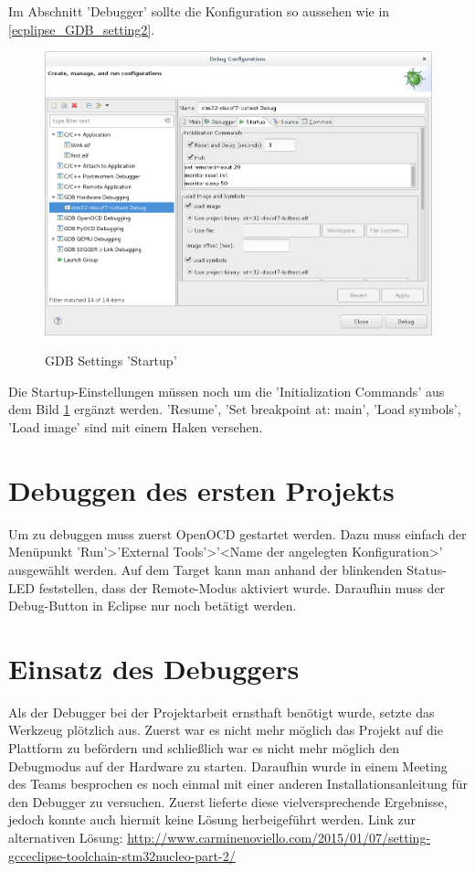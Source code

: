 Im Abschnitt 'Debugger' sollte die Konfiguration so aussehen wie in \ref{ecplipse_GDB_setting2}.
\begin{figure}[h]
\begin{center}
\includegraphics[width=12cm]{grafiken/debugger/GDBsetting3.png}
\label{ecplipse_GDB_setting3}
\caption{GDB Settings 'Startup'}
\end{center}
\end{figure}
Die Startup-Einstellungen müssen noch um die 'Initialization Commands' aus dem Bild \ref{ecplipse_GDB_setting3} ergänzt werden.
'Resume', 'Set breakpoint at: main', 'Load symbols', 'Load image' sind mit einem Haken versehen. 
\FloatBarrier
\section{Debuggen des ersten Projekts}
Um zu debuggen muss zuerst OpenOCD gestartet werden. Dazu muss einfach der Menüpunkt 'Run'>'External Tools'>'<Name der angelegten Konfiguration>' ausgewählt werden. Auf dem Target kann man anhand der blinkenden Status-LED feststellen, dass der Remote-Modus aktiviert wurde. Daraufhin muss der Debug-Button in Eclipse nur noch betätigt werden.
\section{Einsatz des Debuggers}
Als der Debugger bei der Projektarbeit ernsthaft benötigt wurde, setzte das Werkzeug plötzlich aus. Zuerst war es nicht mehr möglich das Projekt auf die Plattform zu befördern und schließlich war es nicht mehr möglich den Debugmodus auf der Hardware zu starten. 
Daraufhin wurde in einem Meeting des Teams besprochen es noch einmal mit einer anderen Installationsanleitung für den Debugger zu versuchen. Zuerst lieferte diese vielversprechende Ergebnisse, jedoch konnte auch hiermit keine Lösung herbeigeführt werden. 
Link zur alternativen Lösung: \url{http://www.carminenoviello.com/2015/01/07/setting-gcceclipse-toolchain-stm32nucleo-part-2/}
